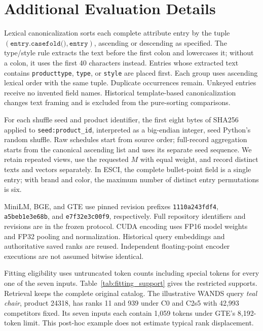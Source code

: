 \section{Additional Evaluation Details}
\label{app:evaluation_details}



Lexical canonicalization sorts each complete attribute entry by the tuple
$(\texttt{entry.casefold()},\texttt{entry})$, ascending or descending as specified.
The type/style rule extracts the text before the first colon and lowercases it;
without a colon, it uses the first 40 characters instead. Entries whose extracted
text contains \texttt{producttype}, \texttt{type}, or \texttt{style} are placed first.
Each group uses ascending lexical order with the same tuple. Duplicate occurrences
remain. Unkeyed entries receive no invented field names. Historical template-based
canonicalization changes text framing and is excluded from the pure-sorting comparisons.

For each shuffle seed and product identifier, the first eight bytes of
SHA256 applied to \texttt{seed:product\_id}, interpreted as a big-endian integer,
seed Python's random shuffle. Raw schedules start from source order; full-record
aggregation starts from the canonical ascending list and uses its separate seed
sequence. We retain repeated views, use the requested $M$ with equal weight, and
record distinct texts and vectors separately. In ESCI, the complete bullet-point
field is a single entry; with brand and color, the maximum number of distinct
entry permutations is six.

MiniLM, BGE, and GTE use pinned revision prefixes
\texttt{1110a2\allowbreak 43fdf4}, \texttt{a5beb1\allowbreak e3e68b}, and \texttt{e7f32e\allowbreak 3c00f9},
respectively. Full repository identifiers and revisions are in the frozen protocol.
CUDA encoding uses FP16 model weights and FP32 pooling and normalization.
Historical query embeddings and authoritative saved ranks are reused.
Independent floating-point encoder executions are not assumed bitwise identical.

Fitting eligibility uses untruncated token counts including special tokens for
every one of the seven inputs. Table~\ref{tab:fitting_support} gives the restricted
supports. Retrieval keeps the complete original catalog. The illustrative
WANDS query \emph{teal chair}, product 24318, has ranks 11 and 939 under C0 and C2s5
with 42,993 competitors fixed. Its seven inputs each contain 1,059 tokens under
GTE's 8,192-token limit. This post-hoc example does not estimate typical rank displacement.

